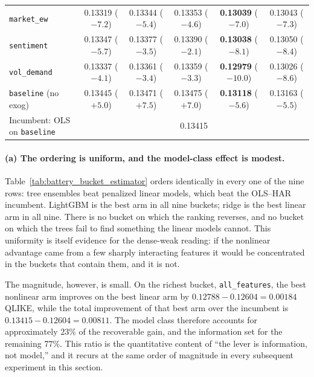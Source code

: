 \begin{table}[H]
\begin{tabular}{@{}lccccc@{}}
\texttt{market\_ew}    & 0.13319 ($-7.2$)  & 0.13344 ($-5.4$)  & 0.13353 ($-4.6$)  & \textbf{0.13039} ($-7.0$)  & 0.13043 ($-7.3$) \\
\texttt{sentiment}     & 0.13347 ($-5.7$)  & 0.13377 ($-3.5$)  & 0.13390 ($-2.1$)  & \textbf{0.13038} ($-8.1$)  & 0.13050 ($-8.4$) \\
\texttt{vol\_demand}   & 0.13337 ($-4.1$)  & 0.13361 ($-3.4$)  & 0.13359 ($-3.3$)  & \textbf{0.12979} ($-10.0$) & 0.13026 ($-8.6$) \\
\midrule
\texttt{baseline} (no exog) & 0.13445 ($+5.0$) & 0.13471 ($+7.5$) & 0.13475 ($+7.0$) & \textbf{0.13118} ($-5.6$) & 0.13163 ($-5.5$) \\
Incumbent: OLS on \texttt{baseline} & \multicolumn{5}{c}{0.13415} \\
\bottomrule
\end{tabular}
\end{table}

\paragraph{(a) The ordering is uniform, and the model-class effect is modest.}
Table~\ref{tab:battery_bucket_estimator} orders identically in every one of the
nine rows: tree ensembles beat penalized linear models, which beat the OLS--HAR
incumbent. LightGBM is the best arm in all nine buckets; ridge is the best linear
arm in all nine. There is no bucket on which the ranking reverses, and no bucket
on which the trees fail to find something the linear models cannot. This
uniformity is itself evidence for the dense-weak reading: if the nonlinear
advantage came from a few sharply interacting features it would be concentrated
in the buckets that contain them, and it is not.

The magnitude, however, is small. On the richest bucket, \texttt{all\_features},
the best nonlinear arm improves on the best linear arm by $0.12788 - 0.12604 =
0.00184$ QLIKE, while the total improvement of that best arm over the incumbent
is $0.13415 - 0.12604 = 0.00811$. The model class therefore accounts for
approximately $23\%$ of the recoverable gain, and the information set for the
remaining $77\%$. This ratio is the quantitative content of ``the lever is
information, not model,'' and it recurs at the same order of magnitude in every
subsequent experiment in this section.

